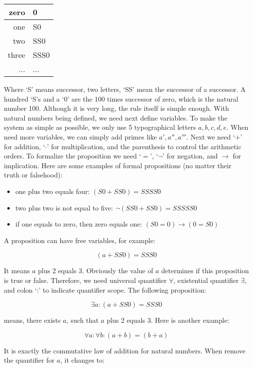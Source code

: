 \documentclass[b5paper]{article}
\begin{document}
\vspace{5mm}
\begin{tabular}{|r|l|}
zero & 0 \\
\hline
one & S0 \\
\hline
two & SS0 \\
\hline
three & SSS0 \\
\hline
... & ... \\
\end{tabular}
\vspace{5mm}

Where `S' means successor, two letters, `SS' mean the successor of a successor. A hundred `S's and a `0' are the 100 times successor of zero, which is the natural number 100. Although it is very long, the rule itself is simple enough. With natural numbers being defined, we need next define variables. To make the system as simple as possible, we only use 5 typographical letters $a, b, c, d, e$. When need more variables, we can simply add primes like $a', a'', a'''$. Next we need `$+$' for addition, `$\cdot$' for multiplication, and the parenthesis to control the arithmetic orders. To formalize the proposition we need `$=$', `$\lnot$' for negation, and $\to$ for implication. Here are some examples of formal propositions (no matter their truth or falsehood):

\begin{itemize}
\item one plus two equals four: $(S0 + SS0) = SSSS0$
\item two plus two is not equal to five: $\lnot (SS0 + SS0) = SSSSS0$
\item if one equals to zero, then zero equals one: $(S0 = 0) \to (0 = S0)$
\end{itemize}

A proposition can have free variables, for example:

\[
(a + SS0) = SSS0
\]

It means $a$ plus 2 equals 3. Obviously the value of $a$ determines if this proposition is true or false. Therefore, we need universal quantifier $\forall$, existential quantifier $\exists$, and colon `:' to indicate quantifier scope. The following proposition:

\[
\exists a : (a + SS0) = SSS0
\]

means, there exists $a$, such that $a$ plus 2 equals 3. Here is another example:

\[
\forall a : \forall b : (a + b) = (b + a)
\]

It is exactly the commutative law of addition for natural numbers. When remove the quantifier for $a$, it changes to:
\end{document}
